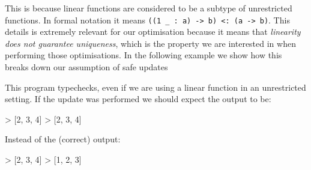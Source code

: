 \documentclass[
]{article}
\newenvironment{Shaded}{}{}
\newcommand{\DataTypeTok}[1]{\textcolor[rgb]{0.56,0.13,0.00}{#1}}
\newcommand{\DecValTok}[1]{\textcolor[rgb]{0.25,0.63,0.44}{#1}}
\newcommand{\FunctionTok}[1]{\textcolor[rgb]{0.02,0.16,0.49}{#1}}
\newcommand{\KeywordTok}[1]{\textcolor[rgb]{0.00,0.44,0.13}{\textbf{#1}}}
\newcommand{\NormalTok}[1]{#1}
\newcommand{\OperatorTok}[1]{\textcolor[rgb]{0.40,0.40,0.40}{#1}}
\newcommand{\OtherTok}[1]{\textcolor[rgb]{0.00,0.44,0.13}{#1}}
\begin{document}
This is because linear functions are considered to be a subtype of
unrestricted functions. In formal notation it means
\texttt{((1\ \_\ :\ a)\ -\textgreater{}\ b)\ \textless{}:\ (a\ -\textgreater{}\ b)}.
This details is extremely relevant for our optimisation because it means
that \emph{linearity does not guarantee uniqueness}, which is the
property we are interested in when performing those optimisations. In
the following example we show how this breaks down our assumption of
safe updates

\begin{Shaded}
\end{Shaded}

This program typechecks, even if we are using a linear function in an
unrestricted setting. If the update was performed we should expect the
output to be:

\begin{Shaded}
\begin{Highlighting}[]
\OperatorTok{\textgreater{}}\NormalTok{ [}\DecValTok{2}\NormalTok{, }\DecValTok{3}\NormalTok{, }\DecValTok{4}\NormalTok{]}
\OperatorTok{\textgreater{}}\NormalTok{ [}\DecValTok{2}\NormalTok{, }\DecValTok{3}\NormalTok{, }\DecValTok{4}\NormalTok{]}
\end{Highlighting}
\end{Shaded}

Instead of the (correct) output:

\begin{Shaded}
\begin{Highlighting}[]
\OperatorTok{\textgreater{}}\NormalTok{ [}\DecValTok{2}\NormalTok{, }\DecValTok{3}\NormalTok{, }\DecValTok{4}\NormalTok{]}
\OperatorTok{\textgreater{}}\NormalTok{ [}\DecValTok{1}\NormalTok{, }\DecValTok{2}\NormalTok{, }\DecValTok{3}\NormalTok{]}
\end{Highlighting}
\end{Shaded}
\end{document}
